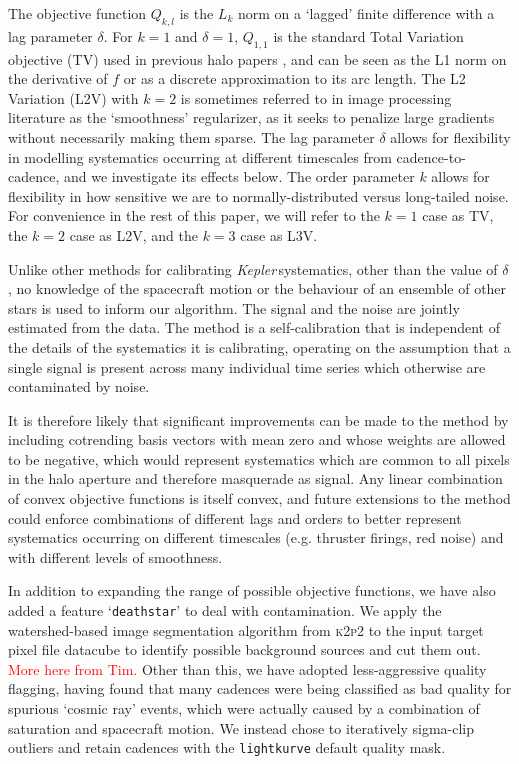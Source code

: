 \documentclass[modern]{aastex62}
\newcommand\kepler{\emph{Kepler}\,}
\begin{document}
The objective function $Q_{k,l}$ is the $L_k$ norm on a `lagged' finite difference with a lag parameter $\delta$. For $k = 1$ and $\delta = 1$, $Q_{1,1}$ is the standard Total Variation objective (TV) used in previous halo papers \citep[e.g.][]{White2017,Farr2018}, and can be seen as the L1 norm on the derivative of $f$ or as a discrete approximation to its arc length. The L2 Variation (L2V) with $k=2$ is sometimes referred to in image processing literature as the `smoothness' regularizer, as it seeks to penalize large gradients without necessarily making them sparse. The lag parameter $\delta$ allows for flexibility in modelling systematics occurring at different timescales from cadence-to-cadence, and we investigate its effects below. The order parameter $k$ allows for flexibility in how sensitive we are to normally-distributed versus long-tailed noise. For convenience in the rest of this paper, we will refer to the $k=1$ case as TV, the $k=2$ case as L2V, and the $k=3$ case as L3V.

Unlike other methods for calibrating \kepler systematics, other than the value of $\delta$, no knowledge of the spacecraft motion or the behaviour of an ensemble of other stars is used to inform our algorithm. The signal and the noise are jointly estimated from the data. The method is a self-calibration that is independent of the details of the systematics it is calibrating, operating on the assumption that a single signal is present across many individual time series which otherwise are contaminated by noise. 

It is therefore likely that significant improvements can be made to the method by including cotrending basis vectors with mean zero and whose weights are allowed to be negative, which would represent systematics which are common to all pixels in the halo aperture and therefore masquerade as signal. Any linear combination of convex objective functions is itself convex, and future extensions to the method could enforce combinations of different lags and orders to better represent systematics occurring on different timescales (e.g. thruster firings, red noise) and with different levels of smoothness.


In addition to expanding the range of possible objective functions, we have also added a feature `\texttt{deathstar}' to deal with contamination. We apply the watershed-based image segmentation algorithm from \textsc{k2p2} \citep{k2p2} to the input target pixel file datacube to identify possible background sources and cut them out. \textcolor{red}{More here from Tim.} Other than this, we have adopted less-aggressive quality flagging, having found that many cadences were being classified as bad quality for spurious `cosmic ray' events, which were actually caused by a combination of saturation and spacecraft motion. We instead chose to iteratively sigma-clip outliers and retain cadences with the \texttt{lightkurve} default quality mask.
\end{document}
